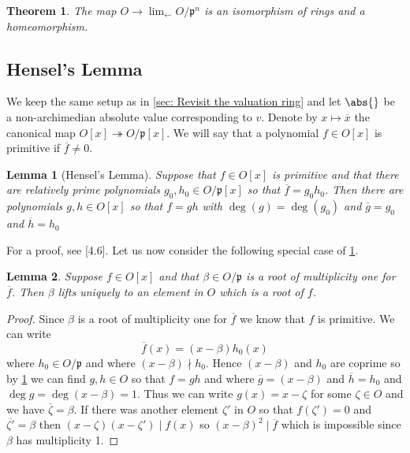 \documentclass{article}
\newtheorem{theorem}{Theorem}[section]
\newtheorem{lemma}{Lemma}[section]
\newcommand{\mfrak}[1]{\mathfrak{#1}}
\numberwithin{equation}{section}
\begin{document}
\begin{theorem}\label{thm: Isomorphism of projective limit and ring of integers}
    The map $O \to \lim_{\leftarrow} O / \mfrak p^n$ is an isomorphism of rings and a homeomorphism.
\end{theorem}

\subsection{Hensel's Lemma}
We keep the same setup as in \cref{sec: Revisit the valuation ring} and let $\abs{}$ be a non-archimedian absolute value corresponding to $v$. Denote by $x \mapsto \overline{x}$ the canonical map $O[x] \twoheadrightarrow O / \mfrak p[x]$. We will say that a polynomial $f \in O[x]$ is primitive if $\overline f \neq 0$. 

\begin{lemma}[Hensel's Lemma]\label{lem: Hensel lemma}
    Suppose that $f \in O[x]$ is primitive and that there are relatively prime polynomials $g_0,h_0 \in O/\mfrak p[x]$ so that $\overline f = g_0 h_0$. Then there are polynomials $g,h \in O[x]$ so that $f = gh$ with $\deg(g) = \deg(g_0)$ and $\overline g = g_0$ and $\overline h = h_0$
\end{lemma}
For a proof, see \citep{neukirch}[4.6]. Let us now consider the following special case of \cref{lem: Hensel lemma}.
\begin{lemma} \label{lem: Root lifting}
    Suppose $f \in O[x]$ and that $\beta \in O/\mfrak p$ is a root of multiplicity one for $\overline f$. Then $\beta$ lifts uniquely to an element in $O$ which is a root of $f$. 
\end{lemma}
\begin{proof}
    Since $\beta$ is a root of multiplicity one for $\overline f$ we know that $f$ is primitive. We can write
    $$\overline f(x) = (x - \beta)h_0(x)$$
    where $h_0 \in O/\mfrak p$ and where $(x-\beta) \nmid h_0$. Hence $(x-\beta)$ and $h_0$ are coprime so by \cref{lem: Hensel lemma} we can find $g,h \in O$ so that $f = g h$ and where $\overline g = (x-\beta)$ and $\overline h = h_0$ and $\deg g = \deg (x - \beta) = 1$. Thus we can write $g(x) = x - \zeta$ for some $\zeta \in O$ and we have $\overline \zeta = \beta$. If there was another element $\zeta'$ in $O$ so that $f(\zeta') = 0$ and $\overline {\zeta'} = \beta$ then $(x-\zeta)(x-\zeta') \mid f(x)$ so $(x-\beta)^2 \mid  \overline f$ which is impossible since $\beta$ has multiplicity 1. 
\end{proof}
 
\end{document}
